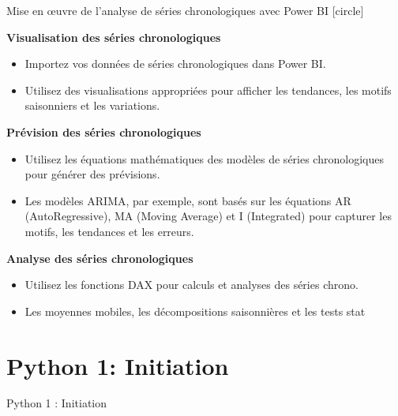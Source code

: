 \documentclass{beamer}
\begin{document}
\begin{frame}[t]{Mise en œuvre de l'analyse de séries chronologiques avec Power BI}
	[circle]
	
	\textbf{Visualisation des séries chronologiques}
	\begin{itemize}
		\item Importez vos données de séries chronologiques dans Power BI.
		\item Utilisez des visualisations appropriées pour afficher les tendances, les motifs saisonniers et les variations.
	\end{itemize}
	
	\vspace{0.3cm}
	\textbf{Prévision des séries chronologiques}
	\begin{itemize}
		\item Utilisez les équations mathématiques des modèles de séries chronologiques pour générer des prévisions.
		\item Les modèles ARIMA, par exemple, sont basés sur les équations AR (AutoRegressive), MA (Moving Average) et I (Integrated) pour capturer les motifs, les tendances et les erreurs.
	\end{itemize}
	
	\vspace{0.3cm}
	\textbf{Analyse des séries chronologiques}
	\begin{itemize}
		\item Utilisez les fonctions DAX pour calculs et analyses des séries chrono.
		\item Les moyennes mobiles, les décompositions saisonnières et les tests stat
	\end{itemize}
\end{frame}











\section{Python 1: Initiation}
{
	\begin{frame}{Python 1 : Initiation}
	\end{frame}
}
\end{document}
